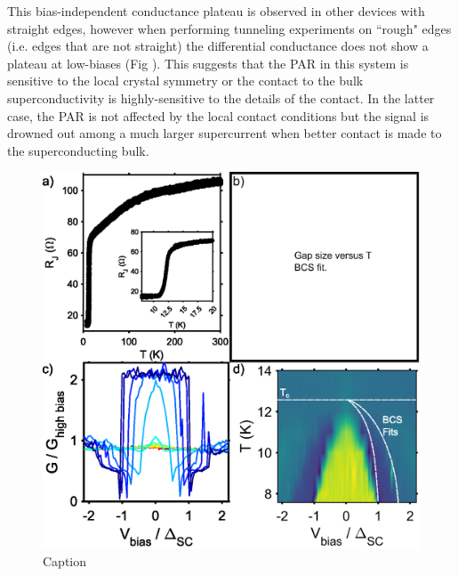 This bias-independent conductance plateau is observed in other devices with straight edges, however when performing tunneling experiments on ``rough" edges (i.e. edges that are not straight) the differential conductance does not show a plateau at low-biases (Fig ). This suggests that the \ac{PAR} in this system is sensitive to the local crystal symmetry or the contact to the bulk superconductivity is highly-sensitive to the details of the contact. In the latter case, the \ac{PAR} is not affected by the local contact conditions but the signal is drowned out among a much larger supercurrent when better contact is made to the superconducting bulk. 
\begin{figure}
    \centering
    \includegraphics[width = \textwidth]{Chap4/Figures/Temperature.eps}
    \caption{Caption}
    \label{fig:PARTemp}
\end{figure}
